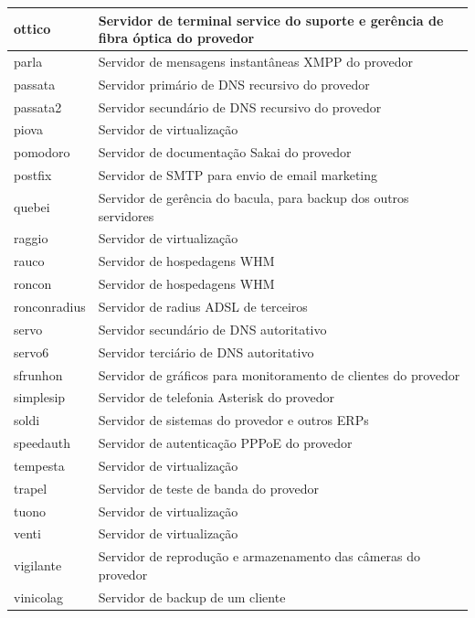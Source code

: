 \begin{table}
\begin{center}
\begin{tabular}{|l|p{12cm}|}
ottico & Servidor de terminal service do suporte e gerência de fibra óptica do provedor\\\hline
parla & Servidor de mensagens instantâneas XMPP do provedor\\\hline
passata & Servidor primário de DNS recursivo do provedor\\\hline
passata2 & Servidor secundário de DNS recursivo do provedor\\\hline
piova & Servidor de virtualização\\\hline
pomodoro & Servidor de documentação Sakai do provedor\\\hline
postfix & Servidor de SMTP para envio de email marketing\\\hline
quebei & Servidor de gerência do bacula, para backup dos outros servidores\\\hline
raggio & Servidor de virtualização\\\hline
rauco & Servidor de hospedagens WHM\\\hline
roncon & Servidor de hospedagens WHM\\\hline
ronconradius & Servidor de radius ADSL de terceiros\\\hline
servo & Servidor secundário de DNS autoritativo\\\hline
servo6 & Servidor terciário de DNS autoritativo\\\hline
sfrunhon & Servidor de gráficos para monitoramento de clientes do provedor\\\hline
simplesip & Servidor de telefonia Asterisk do provedor\\\hline
soldi & Servidor de sistemas do provedor e outros ERPs\\\hline
speedauth & Servidor de autenticação PPPoE do provedor\\\hline
tempesta & Servidor de virtualização\\\hline
trapel & Servidor de teste de banda do provedor\\\hline
tuono & Servidor de virtualização\\\hline
venti & Servidor de virtualização\\\hline
vigilante & Servidor de reprodução e armazenamento das câmeras do provedor\\\hline
vinicolag & Servidor de backup de um cliente\\\hline
\end{tabular}
\end{center}
\end{table}


